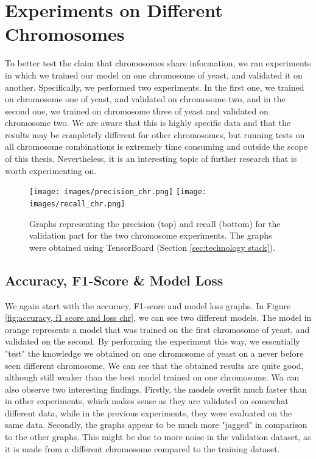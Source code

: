 \documentclass[times, utf8, diplomski, english]{fer_eng}
\begin{document}
\section{Experiments on Different Chromosomes}
\label{sec:experiments on different chromosomes}

To better test the claim that chromosomes share information, we ran experiments in which we trained our model on one chromosome of yeast, and validated it on another. Specifically, we performed two experiments. In the first one, we trained on chromosome one of yeast, and validated on chromosome two, and in the second one, we trained on chromosome three of yeast and validated on chromosome two. We are aware that this is highly specific data and that the results may be completely different for other chromosomes, but running tests on all chromosome combinations is extremely time consuming and outside the scope of this thesis. Nevertheless, it is an interesting topic of further research that is worth experimenting on.

\begin{figure}[h]
	\centering
	\texttt{[image: images/precision\_chr.png]}
	\texttt{[image: images/recall\_chr.png]}
	\caption[Precision and recall graph on chromosomes]{Graphs representing the precision (top) and recall (bottom) for the validation part for the two chromosome experiments. The graphs were obtained using TensorBoard (Section \ref{sec:technology stack}).}
	\label{fig:precision and recall chr}
\end{figure}

\subsection{Accuracy, F1-Score \& Model Loss}
\label{subsec:accuracy, f1-score and model loss chr}

We again start with the accuracy, F1-score and model loss graphs. In Figure \ref{fig:accuracy, f1 score and loss chr}, we can see two different models. The model in orange represents a model that was trained on the first chromosome of yeast, and validated on the second. By performing the experiment this way, we essentially "test" the knowledge we obtained on one chromosome of yeast on a never before seen different chromosome. We can see that the obtained results are quite good, although still weaker than the best model trained on one chromosome. Wa can also observe two interesting findings. Firstly, the models overfit much faster than in other experiments, which makes sense as they are validated on somewhat different data, while in the previous experiments, they were evaluated on the same data. Secondly, the graphs appear to be much more "jagged" in comparison to the other graphs. This might be due to more noise in the validation dataset, as it is made from a different chromosome compared to the training dataset.
\end{document}
